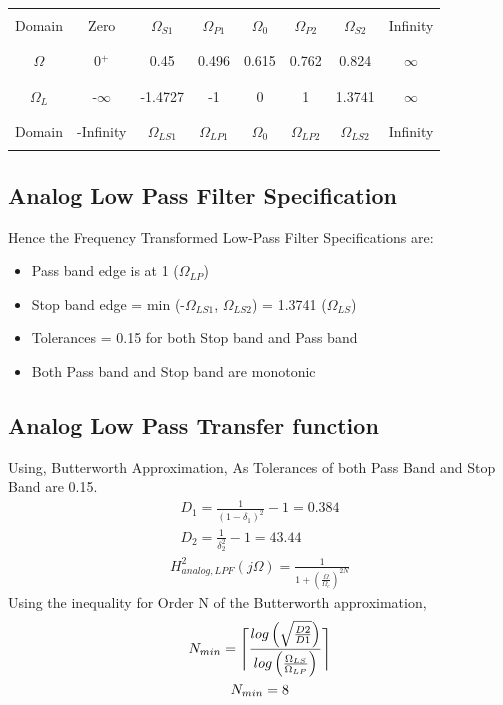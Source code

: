 \documentclass[12pt]{article}
\begin{document}
	\begin{center}
		\begin{tabular}{ |c|c|c|c|c|c|c|c| }
			\hline
			&&&&&&&\\
			Domain &Zero & $\Omega_{S1}$ & $\Omega_{P1}$ &$\Omega_0$ &$\Omega_{P2}$& $\Omega_{S2}$ &Infinity\\
			&&&&&&&\\
			\hline
			&&&&&&&\\
			$\Omega$ & 0$^+$ & 0.45 & 0.496 &0.615 &0.762& 0.824 & $\infty$\\
			&&&&&&&\\
			\hline
			&&&&&&&\\
			$\Omega_L$ & -$\infty$ & -1.4727 & -1 & 0 &1 & 1.3741 & $\infty$\\
			&&&&&&&\\
			\hline
			&&&&&&&\\
			Domain& -Infinity & $\Omega_{LS1}$ & $\Omega_{LP1}$ &$\Omega_0$ &$\Omega_{LP2}$& $\Omega_{LS2}$ &Infinity\\
			&&&&&&&\\
			\hline
		\end{tabular}
	\end{center}


	\color{cyan}
	\subsection{Analog Low Pass Filter Specification}
	\color{black}
	Hence the Frequency Transformed Low-Pass Filter Specifications are:
	\begin{itemize}
		\item Pass band edge is at 1 ($\Omega_{LP}$)
		\item Stop band edge = min (-$\Omega_{LS1}$, $\Omega_{LS2}$) = 1.3741 ($\Omega_{LS}$)
		\item Tolerances = 0.15 for both Stop band and Pass band
		\item Both Pass band and Stop band are monotonic
	\end{itemize}


	\color{cyan}
	\subsection{Analog Low Pass Transfer function}
	\color{black}
	Using, Butterworth Approximation, As Tolerances of both Pass Band and Stop Band are 0.15.
	\begin{gather*}
		D_1 = \frac{1}{(1-\delta_1)^2} - 1 = 0.384\\
		D_2 = \frac{1}{\delta_2^2} - 1 = 43.44
	\end{gather*}
	\begin{gather*}
		H_{analog,LPF}^2(j\Omega) = \frac{1}{1+(\frac{\Omega}{\Omega_{c}})^{2N}} 
	\end{gather*}
	Using the inequality for Order N of the Butterworth approximation,
	\begin{gather*}
		N_{min} = \ceil[\Bigg]{ \frac{log\left(\sqrt{\frac{D2}{D1}}\right)}{log\left(\frac{\Omega_{LS}}{\Omega_{LP}}\right)}} \\
		N_{min} = 8
	\end{gather*}
	
\end{document}
